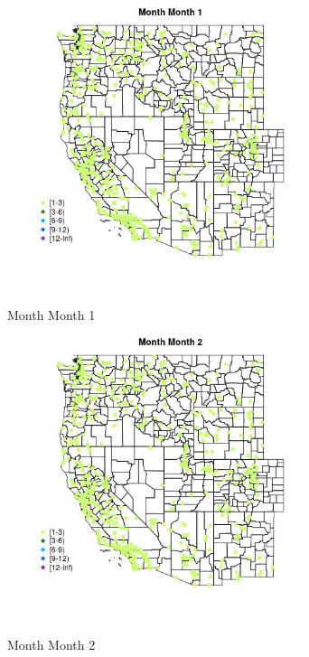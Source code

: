 \begin{figure} 
\centering  
\includegraphics[width=0.77\textwidth]{Code_Outputs/Report_ML_input_PM25_Step4_part_e_de_duplicated_aveswNAs_MapObsMo1Month.jpg} 
\caption{\label{fig:Report_ML_input_PM25_Step4_part_e_de_duplicated_aveswNAsMapObsMo1Month}Month Month 1} 
\end{figure} 
 

\begin{figure} 
\centering  
\includegraphics[width=0.77\textwidth]{Code_Outputs/Report_ML_input_PM25_Step4_part_e_de_duplicated_aveswNAs_MapObsMo2Month.jpg} 
\caption{\label{fig:Report_ML_input_PM25_Step4_part_e_de_duplicated_aveswNAsMapObsMo2Month}Month Month 2} 
\end{figure} 
 

